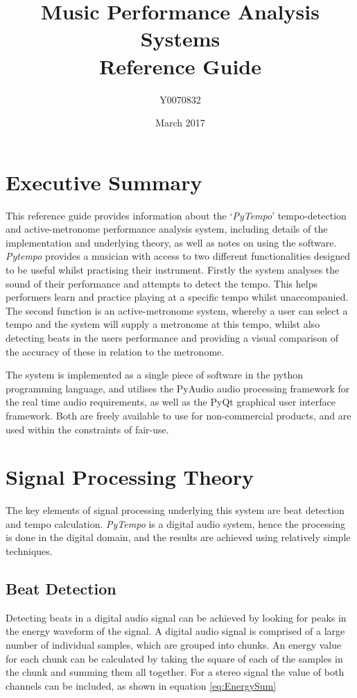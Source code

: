 \documentclass[hidelinks,12pt]{article}
\date{March 2017}
\title{Music Performance Analysis Systems\\\large{Reference Guide}}
\author{Y0070832}
\begin{document}
\maketitle
\tableofcontents
\newpage
\section{Executive Summary}
This reference guide provides information about the `\textit{PyTempo}' tempo-detection and active-metronome performance analysis system, including details of the implementation and underlying theory, as well as notes on using the software. \textit{Pytempo} provides a musician with access to two different functionalities designed to be useful whilst practising their instrument. Firstly the system analyses the sound of their performance and attempts to detect the tempo. This helps performers learn and practice playing at a specific tempo whilst unaccompanied. The second function is an active-metronome system, whereby a user can select a tempo and the system will supply a metronome at this tempo, whilst also detecting beats in the users performance and providing a visual comparison of the accuracy of these in relation to the metronome.

The system is implemented as a single piece of software in the python programming language, and utilises the PyAudio audio processing framework for the real time audio requirements, as well as the PyQt graphical user interface framework. Both are freely available to use for non-commercial products, and are used within the constraints of fair-use.
\section{Signal Processing Theory} \label{Processing}
The key elements of signal processing underlying this system are beat detection and tempo calculation. \textit{PyTempo} is a digital audio system, hence the processing is done in the digital domain, and the results are achieved using relatively simple techniques.
\subsection{Beat Detection} \label{BeatDetection}
Detecting beats in a digital audio signal can be achieved by looking for peaks in the energy waveform of the signal. A digital audio signal is comprised of a large number of individual samples, which are grouped into chunks. An energy value for each chunk can be calculated by taking the square of each of the samples in the chunk and summing them all together. For a stereo signal the value of both channels can be included, as shown in equation \ref{eq:EnergySum}
\end{document}
